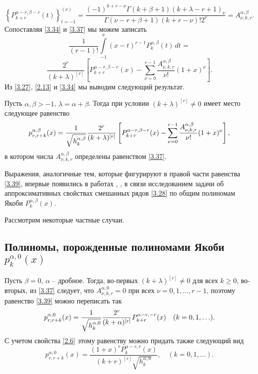 \begin{equation}\label{3.37}
\left\{P_{k+r}^{\alpha-r,\beta-r}(t)\right\}_{t=-1}^{(\nu)}=
\frac{(-1)^{k+r-\nu}\Gamma(k+\beta+1)(k+\lambda-r+1)_{\nu}}
{\Gamma(\nu-r+\beta+1)(k+r-\nu)!2^\nu}
=A_{\nu,k,r}^{\alpha,\beta}.
\end{equation}
Сопоставляя \eqref{3.34} и \eqref{3.37} мы можем записать
$$\frac{1}{(r-1)!}\int\limits^x_{-1}(x-t)^{r-1}P_k^{\alpha,\beta}(t)\,dt=$$
\begin{equation}\label{3.38}
\frac{2^r}{(k+\lambda)^{[r]}}\left[P_{k+r}^{\alpha-r,\beta-r}(x)
-\sum^{r-1}_{\nu=0}\frac{A_{\nu,k,r}^{\alpha,\beta}}{\nu!}(1+x)^{\nu}\right].
\end{equation}
Из \eqref{3.27}, \eqref{2.13} и \eqref{3.34} мы выводим следующий результат.

\begin{theorem} Пусть $\alpha, \beta>-1$, $\lambda=\alpha+\beta$. Тогда  при условии $(k+\lambda)^{[r]}\neq0$ имеет место следующее равенство
\begin{equation}\label{3.39}
p_{r,r+k}^{\alpha,\beta}(x) ={1\over\sqrt{ h_k^{\alpha,\beta}}}
\frac{2^r}{(k+\lambda)^{[r]}}\left[P_{k+r}^{\alpha-r,\beta-r}(x)
-\sum^{r-1}_{\nu=0}\frac{A_{\nu,k,r}^{\alpha,\beta}}{\nu!}(1+x)^{\nu}\right] ,
\end{equation}
в котором числа $A_{\nu,k,r}^{\alpha,\beta}$ определены равенством \eqref{3.37}.
\end{theorem}

\begin{remark} 
  Выражения, аналогичные тем, которые фигурируют в правой части равенства  \eqref{3.39}, впервые появились в   работах \cite{Shar13}, \cite{Shar17}, \cite{Shar18} в связи исследованием задачи об аппроксимативных свойствах смешанных рядов \eqref{3.28} по общим полиномам Якоби $P_{k}^{\alpha,\beta}(x)$.
\end{remark} 
  
  
  Рассмотрим некоторые частные случаи.

\subsection{Полиномы, порожденные полиномами Якоби $p_{k}^{\alpha,0}(x)$}


 Пусть $\beta=0$, $\alpha$ -- дробное. Тогда, во-первых $(k+\lambda)^{[r]}\neq0$ для всех $k\ge0$, во-вторых,  из \eqref{3.37} следует, что $A_{\nu,k,r}^{\alpha,0}=0$ при всех  $\nu=0,1,\dots, r-1$, поэтому равенство \eqref{3.39} можно переписать так
 \begin{equation}\label{3.40}
p_{r,r+k}^{\alpha,0}(x) ={1\over\sqrt{ h_k^{\alpha,0}}}
\frac{2^r}{(k+\alpha)^{[r]}}P_{k+r}^{\alpha-r,-r}(x) \quad (k=0,1,\ldots).
\end{equation}
С учетом свойства \eqref{2.6} этому равенству можно придать также следующий вид
\begin{equation}\label{3.41}
p_{r,r+k}^{\alpha,0}(x) =
\frac{(1+x)^rP_{k}^{\alpha-r,r}(x)}{(k+r)^{[r]}\sqrt{ h_k^{\alpha,0}}},
 \quad (k=0,1,\ldots).
\end{equation}
